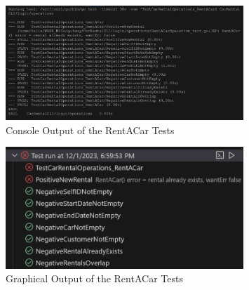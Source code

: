 \begin{figure}
      \centering
      \includegraphics[width=0.8\textwidth]{figures/goLang/carRental/carRentalCLI/carRentalCLI_testingConsoleOutput.png}
      \caption{Console Output of the RentACar Tests}
      \label{fig:carRentalCLI_testingConsoleOutput}
\end{figure}
\begin{figure}
      \centering
      \includegraphics[width=0.8\textwidth]{figures/goLang/carRental/carRentalCLI/carRentalCLI_testingGraphicalOutput.png}
      \caption{Graphical Output of the RentACar Tests}
      \label{fig:carRentalCLI_testingGraphicalOutput}
\end{figure}
